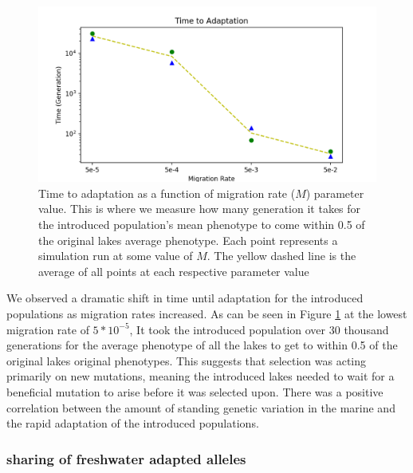 \documentclass{article}
\begin{document}
\begin{figure}
	\begin{center}
  		\includegraphics[width=0.8\linewidth]{matplotlibPlots/TimeToAdaptation.png}
  		\caption{Time to adaptation as a function of migration rate ($M$) parameter value. This is where we measure how many generation
		it takes for the introduced population's mean phenotype to come within 0.5 of the original lakes average phenotype. 
		Each point represents a simulation run at some value of $M$. 
		The yellow dashed line is the average of all points at each respective parameter value}
  		\label{fig:TimeToAdaptation}
	\end{center}
\end{figure}

We observed a dramatic shift in time until adaptation for the introduced populations
as migration rates increased. 
As can be seen in Figure \ref{fig:TimeToAdaptation} at the lowest migration rate of $5 * 10^{-5}$,
It took the introduced population over 30 thousand generations for the average phenotype of all the lakes to 
get to within 0.5 of the original lakes original phenotypes. 
This suggests that selection was acting primarily on new mutations, meaning the 
introduced lakes needed to wait for a beneficial mutation to arise before 
it was selected upon. 
There was a positive correlation between the amount of standing genetic variation in the 
marine and the rapid adaptation of the introduced populations.

 
\subsubsection*{sharing of freshwater adapted alleles}
\end{document}
